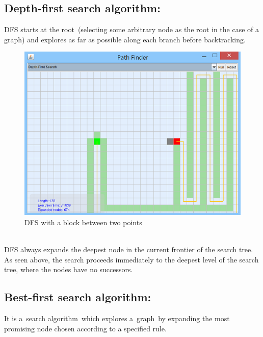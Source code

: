 \documentclass[a4paper]{article}
\begin{document}
\subsection{Depth-first search algorithm:}

DFS starts at the root (selecting some arbitrary node as the root in the case of a graph) and explores as far as possible along each branch before backtracking. \\

\begin{figure}[h!]
  \centering
    \includegraphics[scale=.9]{images/dfs1.png}
  \caption{DFS with a block between two points}
\end{figure}

\noindent \\
DFS always expands the deepest node in the current frontier of the search tree. As seen above, the search proceeds immediately to the deepest level of the search tree, where the nodes have no successors.


\subsection{Best-first search algorithm:}

It is a search algorithm which explores a graph by expanding the most promising node chosen according to a specified rule.\\
\end{document}
